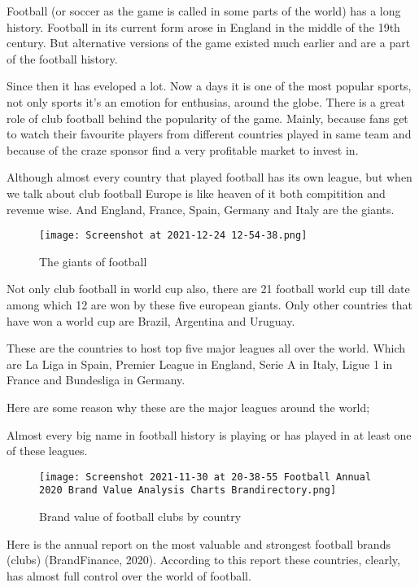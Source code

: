 \documentclass[12pt]{article}
\begin{document}
Football (or soccer as the game is called in some parts of the world) has a long history. Football in its current form arose in England in the middle of the 19th century. But alternative versions of the game existed much earlier and are a part of the football history.

 Since then it has eveloped a lot. Now a days it is one of the most popular sports, not only sports it’s an emotion for enthusias, around the globe. There is a great role of club football behind the popularity of the game. Mainly, because fans get to watch their favourite players from different countries played in same team and because of the craze sponsor find a very profitable market to invest in.
 
  Although almost every country that played football has its own league, but when we talk about club football Europe is like heaven of it both compitition and revenue wise. And England, France, Spain, Germany and Italy are the giants. 
  
  \begin{wrapfigure}{l}{11cm}
  	\caption{ The giants of football }\label{wrap-fig:1}
  	\texttt{[image: Screenshot at 2021-12-24 12-54-38.png]}
  \end{wrapfigure} 
  
  
  Not only club football in world cup also, there are 21 football world cup till date among which 12 are won by these five european giants. Only other countries that have won a world cup are Brazil, Argentina and Uruguay. 
  
  These are the countries to host top five major leagues all over the world. Which are La Liga in Spain, Premier League in England, Serie A in Italy, Ligue 1 in France and Bundesliga in Germany. 
  
  Here are some reason why these are the major leagues around the world;
  
   Almost every big name in football history is playing or has played in at least one of these leagues.
   
\begin{wrapfigure}{r}{11cm}
	\caption{Brand value of football clubs by country }\label{wrap-fig:1}
	\texttt{[image: Screenshot 2021-11-30 at 20-38-55 Football Annual 2020 Brand Value Analysis Charts Brandirectory.png]}
\end{wrapfigure} 
Here is the annual report on the most valuable and strongest football brands (clubs) (BrandFinance, 2020). According to this report these countries, clearly, has almost full control over the world of football. \\
\end{document}
